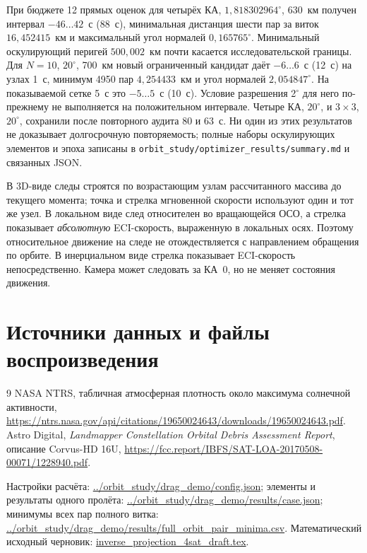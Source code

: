 \documentclass[a4paper,12pt]{article}
\begin{document}
При бюджете 12 прямых оценок для четырёх КА, $1{,}818302964^\circ$,
630~км получен интервал $-46\ldots42$~с (88~с), минимальная
дистанция шести пар за виток $16{,}452415$~км и максимальный угол
нормалей $0{,}165765^\circ$. Минимальный оскулирующий перигей
$500{,}002$~км почти касается исследовательской границы.
Для $N=10$, $20^\circ$, 700~км новый ограниченный кандидат даёт
$-6\ldots6$~с (12~с) на узлах 1~с, минимум 4950 пар
$4{,}254433$~км и угол нормалей $2{,}054847^\circ$.
На показываемой сетке 5~с это $-5\ldots5$~с (10~с).
Условие разрешения 2$^\circ$ для него по-прежнему не выполняется
на положительном интервале. Четыре КА, $20^\circ$, и $3\times3$,
$20^\circ$, сохранили после повторного аудита 80 и 63~с.
Ни один из этих результатов не доказывает долгосрочную повторяемость;
полные наборы оскулирующих элементов и эпоха записаны в
\texttt{orbit\_study/optimizer\_results/summary.md} и связанных JSON.

В 3D-виде следы строятся по возрастающим узлам рассчитанного массива
до текущего момента; точка и стрелка мгновенной скорости используют
один и тот же узел. В локальном виде след относителен во вращающейся
ОСО, а стрелка показывает \emph{абсолютную} ECI-скорость, выраженную
в локальных осях. Поэтому относительное движение на следе не
отождествляется с направлением обращения по орбите. В инерциальном
виде стрелка показывает ECI-скорость непосредственно. Камера может
следовать за КА~0, но не меняет состояния движения.

\section*{Источники данных и файлы воспроизведения}
\begin{thebibliography}{9}
 NASA NTRS, табличная атмосферная плотность
  около максимума солнечной активности,
  \url{https://ntrs.nasa.gov/api/citations/19650024643/downloads/19650024643.pdf}.
 Astro Digital, \emph{Landmapper Constellation Orbital Debris
  Assessment Report}, описание Corvus-HD 16U,
  \url{https://fcc.report/IBFS/SAT-LOA-20170508-00071/1228940.pdf}.
\end{thebibliography}

Настройки расчёта: \url{../orbit_study/drag_demo/config.json};
элементы и результаты одного пролёта:
\url{../orbit_study/drag_demo/results/case.json};
минимумы всех пар полного витка:
\url{../orbit_study/drag_demo/results/full_orbit_pair_minima.csv}.
Математический исходный черновик:
\url{inverse_projection_4sat_draft.tex}.
\end{document}
